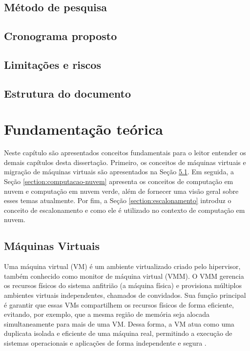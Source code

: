 \documentclass[
	12pt,				%
	oneside,			%
	a4paper,			%
	english,			%
	brazil				%
	]{abntex2ppgsi}
\begin{document}
\section{Método de pesquisa}

\section{Cronograma proposto}

\section{Limitações e riscos}

\section{Estrutura do documento}

\chapter{Fundamentação teórica}\label{chapter:fundamentacao-teorica}

Neste capítulo são apresentados conceitos fundamentais para o leitor entender os demais capítulos desta dissertação. Primeiro, os conceitos de máquinas virtuais e migração de máquinas virtuais são apresentados na Seção \ref{section:maquinas-virtuais}. Em seguida, a Seção \ref{section:computacao-nuvem} apresenta os conceitos de computação em nuvem e computação em nuvem verde, além de fornecer uma visão geral sobre esses temas atualmente. Por fim, a Seção \ref{section:escalonamento} introduz o conceito de escalonamento e como ele é utilizado no contexto de computação em nuvem.

\section{Máquinas Virtuais}\label{section:maquinas-virtuais}

Uma máquina virtual (VM) é um ambiente virtualizado criado pelo hipervisor, também conhecido como monitor de máquina virtual (VMM). O VMM gerencia os recursos físicos do sistema anfitrião (a máquina física) e provisiona múltiplos ambientes virtuais independentes, chamados de convidados. Sua função principal é garantir que essas VMs compartilhem os recursos físicos de forma eficiente, evitando, por exemplo, que a mesma região de memória seja alocada simultaneamente para mais de uma VM. Dessa forma, a VM atua como uma duplicata isolada e eficiente de uma máquina real, permitindo a execução de sistemas operacionais e aplicações de forma independente e segura \cite{10.1145/361011.361073}.
\end{document}
